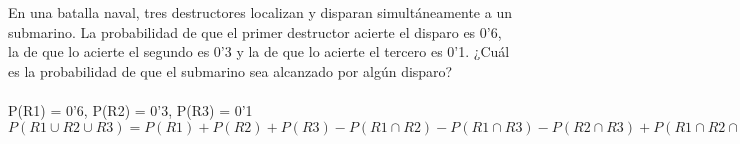 \problem
En una batalla naval, tres destructores localizan y disparan simultáneamente a un submarino. La probabilidad de que el primer destructor acierte el disparo es 0'6, la de que lo acierte el segundo es 0'3 y la de que lo acierte el tercero es 0'1. ¿Cuál es la probabilidad de que el submarino sea alcanzado por algún disparo? \\ \\
P(R1) = 0'6, P(R2) = 0'3, P(R3) = 0'1 \\
$P(R1 \cup R2 \cup R3) = P(R1) + P(R2) + P(R3) - P(R1 \cap R2) - P(R1 \cap R3) - P(R2 \cap R3) + P(R1 \cap R2 \cap R3) = 0'6+0'3+0'1-(0'6*0'1)-(0'6*0'3)-(0'1*0'3)+(0'6*0'3*0'1) = 0'748 $\\